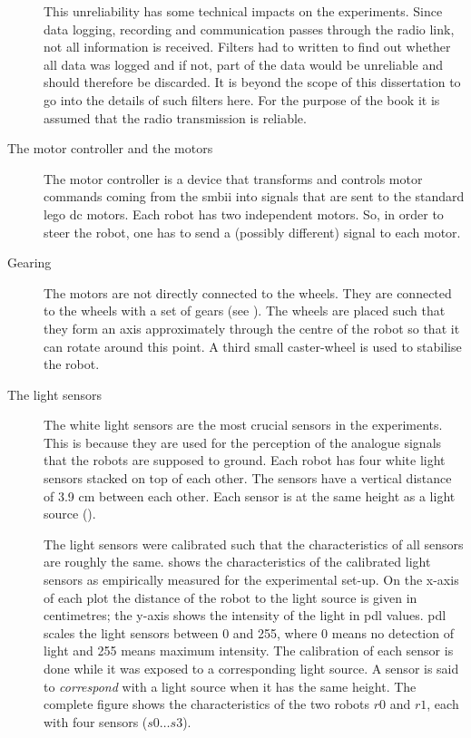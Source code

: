 \begin{description}
This unreliability has some technical impacts on the experiments. Since data logging, recording and communication passes through the radio link, not all information is received. Filters had to written to find out whether all data was logged and if not, part of the data would be unreliable and should therefore be discarded. It is beyond the scope of this dissertation to go into the details of such filters here. For the purpose  of the book it is assumed that the radio transmission is reliable.

\item[The motor controller and the motors] The motor controller is a device that transforms and controls motor commands coming from the {\sc smbii} into signals that are sent to the standard {\sc lego dc} motors. Each robot has two independent motors. So, in order to steer the robot, one has to send a (possibly different) signal to each motor.

\item[Gearing] The motors are not directly connected to the wheels. They are connected to the wheels with a set of gears (see ). The wheels are placed such that they form an axis approximately through the centre of the robot so that it can rotate around this point. A third small caster-wheel is used to stabilise the robot. 

\item[The light sensors] The white light sensors are the most crucial sensors in the experiments. This is because they are used for the perception of the analogue signals that the robots are supposed to ground. Each robot has four white light sensors stacked on top of each other. The sensors have a vertical distance of 3.9 cm between each other. Each sensor is at the same height as a light source (). 

The light sensors were calibrated such that the characteristics of all sensors are roughly the same.  shows the characteristics of the calibrated light sensors as empirically measured for the experimental set-up. On the x-axis of each plot the distance of the robot to the light source is given in centimetres; the y-axis shows the intensity of the light in {\sc pdl} values. {\sc pdl} scales the light sensors between 0 and 255, where 0 means no detection of light and 255 means maximum intensity. The calibration of each sensor is done while it was exposed to a corresponding light source. A sensor is said to {\em correspond} with a light source when it has the same height. The complete figure shows the characteristics of the two robots $r0$ and $r1$, each with four sensors ($s0 \ldots s3$).


\end{description}
